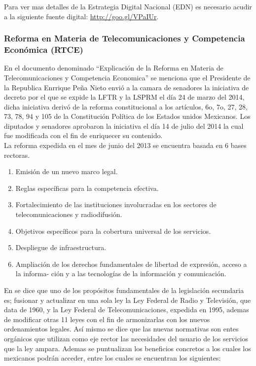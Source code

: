 \documentclass[runningheads,a4paper]{llncs}
\begin{document}
Para ver mas detalles de la Estrategia Digital Nacional (EDN) es necesario acudir a la siguiente fuente digital: \url{http://goo.gl/VPaIUr}.

\subsubsection{Reforma en Materia de Telecomunicaciones y Competencia Económica (RTCE)}
En el documento denominado ``Explicación de la Reforma en Materia de Telecomunicaciones y Competencia Economica'' \cite{RMT_1} se menciona que el Presidente de la Republica Enrrique Peña Nieto envió a la camara de senadores la iniciativa de decreto por el que se expide la \gls{LFTR} y la \gls{LSPRM} el día 24 de marzo del 2014, dicha iniciativa derivó de la reforma constitucional a los artículos, 6o, 7o, 27, 28, 73, 78, 94 y 105 de la Constitución Política de los Estados unidos Mexicanos. Los diputados y senadores aprobaron la iniciativa el día 14 de julio del 2014 la cual fue modificada con el fin de enriquecer su contenido.\\

La reforma expedida en el mes de junio del 2013 se encuentra basada en 6 bases rectoras.

\begin{enumerate}
	\item Emisión de un nuevo marco legal.
	\item Reglas específicas para la competencia efectiva.
	\item Fortalecimiento de las instituciones involucradas en los sectores de telecomunicaciones y
radiodifusión.
	\item Objetivos específicos para la cobertura universal de los servicios.
	\item Despliegue de infraestructura.
	\item Ampliación de los derechos fundamentales de libertad de expresión, acceso a la informa-
ción y a las tecnologías de la información y comunicación.
\end{enumerate}

En \cite{RMT_1} se dice que uno de los propósitos fundamentales de la legislación secundaria es; fusionar y actualizar en una sola ley la Ley Federal de Radio y Televisión, que data de 1960, y la Ley Federal de Telecomunicaciones, expedida en 1995, ademas de modificar otras 11 leyes con el fin de armonizarlas con los nuevos ordenamientos legales. Así mismo se dice que las nuevas normativas son entes orgánicos que utilizan como eje rector las necesidades del usuario de los servicios que la ley ampara. Ademas se puntualizan los beneficios concretos a los cuales los mexicanos podrán acceder, entre los cuales se encuentran los siguientes: \\
\end{document}
